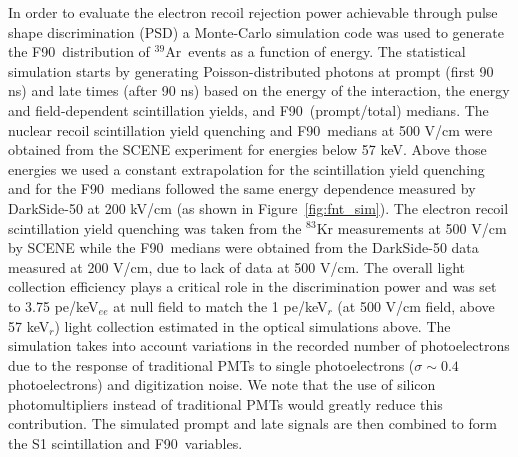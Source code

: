 \documentclass[a4paper,11pt]{article}
\newcommand{\artn}{$^{39}$Ar}
\newcommand{\fnt}{F90}
\newcommand{\psd}{PSD}
\begin{document}
In order to evaluate the electron recoil rejection power achievable through pulse shape discrimination (\psd) a Monte-Carlo simulation code was used to generate the \fnt~distribution of \artn~events as a function of energy. The statistical simulation starts by generating Poisson-distributed photons at prompt (first 90 ns) and late times (after 90 ns) based on the energy of the interaction, the energy and field-dependent scintillation yields, and \fnt~(prompt/total) medians. The nuclear recoil scintillation yield quenching and \fnt~medians at 500 V/cm were obtained from the SCENE experiment \cite{cao2015measurement, cao2014study} for energies below 57 keV. Above those energies we used a constant extrapolation for the scintillation yield quenching and for the \fnt~medians followed the same energy dependence measured by DarkSide-50 at 200 kV/cm \cite{agnes2018darkside} (as shown in Figure~\ref{fig:fnt_sim}). The electron recoil scintillation yield quenching was taken from the $^{83}$Kr measurements at 500 V/cm by SCENE \cite{cao2015measurement, cao2014study} while the \fnt~medians were obtained from the DarkSide-50 data \cite{agnes2015first} measured at 200 V/cm, due to lack of data at 500 V/cm. The overall light collection efficiency plays a critical role in the discrimination power and was set to 3.75 pe/keV$_{ee}$ at null field to match the 1 pe/keV$_{r}$ (at 500 V/cm field, above 57 keV$_{r}$) light collection estimated in the optical simulations above. The simulation takes into account variations in the recorded number of photoelectrons due to the response of traditional PMTs to single photoelectrons ($\sigma \sim 0.4$ photoelectrons) and digitization noise. We note that the use of silicon photomultipliers instead of traditional PMTs would greatly reduce this contribution. The simulated prompt and late signals are then combined to form the S1 scintillation and \fnt~variables. 
\end{document}
